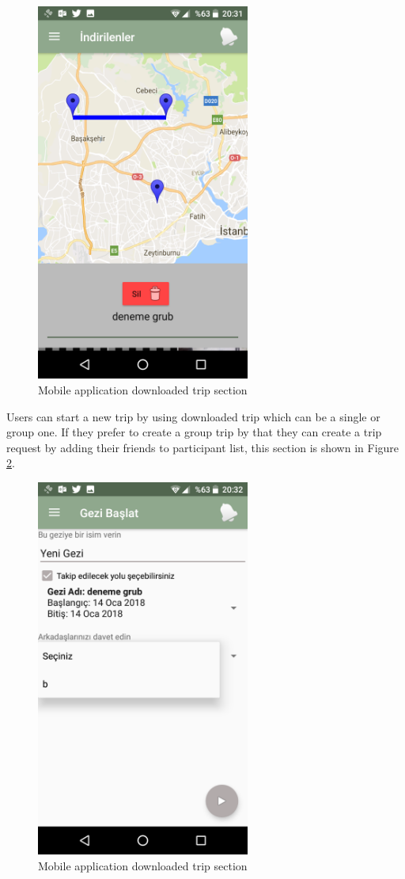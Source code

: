 \begin{figure}[!htbp]
\centering
\includegraphics[width=70mm,scale=0.7]{projectChapters/images/downloadedTrip.png}
\caption{Mobile application downloaded trip section}
\label{fig:downloadedTrip}
\end{figure}

\newpage

Users can start a new trip by using downloaded trip which can be a single or group one. If they prefer to create a group trip by that they can create a trip request by adding their friends to   participant list, this section is shown in Figure \ref{fig:downloadedTripManage}.

\begin{figure}[!htbp]
\centering
\includegraphics[width=70mm,scale=0.7]{projectChapters/images/downloadedTripManage.png}
\caption{Mobile application downloaded trip section}
\label{fig:downloadedTripManage}
\end{figure}

